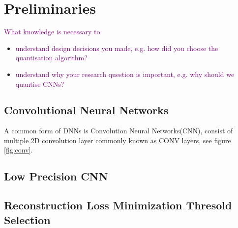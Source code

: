 \chapter{Preliminaries}
\label{ch:related_work}
\textcolor{purple}{What knowledge is necessary to}
\begin{itemize}
    \item \textcolor{purple}{understand design decisions you made, e.g. how did you choose the quantisation algorithm?}
    \item \textcolor{purple}{understand why your research question is important, e.g. why should we quantise CNNs?}
\end{itemize}

\section{Convolutional Neural Networks}
A common form of DNNs is Convolution Neural Networks(CNN), consist of multiple 2D convolution layer commonly known as CONV layers, see figure \ref{fig:conv}. 
\section{Low Precision CNN}
\section{Reconstruction Loss Minimization Thresold Selection}